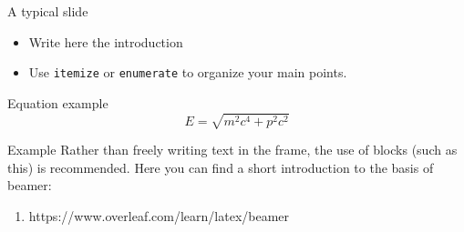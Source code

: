 \documentclass[aspectratio=169, mathserif]{beamer}
\begin{document}
	\begin{frame}
	
	\end{frame}
	
	
	\begin{frame}{A typical slide}
		
		
		\begin{itemize}
			\item Write here the introduction
			\item Use \texttt{itemize} or \texttt{enumerate} to organize your main points.
		\end{itemize}
	
		\begin{block}{Equation example}
			\begin{equation}
				E = \sqrt{m^2c^4 + p^2c^2}
			\end{equation}
		\end{block}
	
		\begin{block}{Example}
			Rather than freely writing text in the frame, the use of blocks (such as this) is recommended.
			Here you can find a short introduction to the basis of beamer:
			\begin{enumerate}
				\item https://www.overleaf.com/learn/latex/beamer
			\end{enumerate}
		\end{block}
		
	\end{frame}	
	
\end{document}
